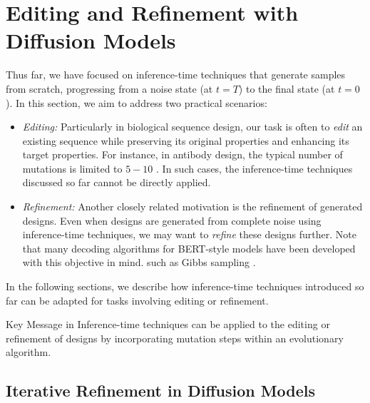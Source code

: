  \section{Editing and Refinement with Diffusion Models}\label{sec:editing}

Thus far, we have focused on inference-time techniques that generate samples from scratch, progressing from a noise state (at $t=T$) to the final state (at $t=0$). In this section, we aim to address two practical scenarios:
\begin{itemize}
\item \emph{Editing:} Particularly in biological sequence design, our task is often to \emph{edit} an existing sequence while preserving its original properties and enhancing its target properties. For instance, in antibody design, the typical number of mutations is limited to $5-10$ \citep{bachas2022antibody}. In such cases, the inference-time techniques discussed so far cannot be directly applied.
\item \emph{Refinement:} Another closely related motivation is the refinement of generated designs. Even when designs are generated from complete noise using inference-time techniques, we may want to \emph{refine} these designs further. Note that many decoding algorithms for BERT-style models have been developed with this objective in mind.
such as Gibbs sampling \citep{wang2019bert,miao2019cgmh}.
\end{itemize}
 In the following sections, we describe how inference-time techniques introduced so far can be adapted for tasks involving editing or refinement.

\begin{AIbox}{Key Message in }
Inference-time techniques can be applied to the editing or refinement of designs by incorporating mutation steps within an evolutionary algorithm.
\end{AIbox}

\subsection{Iterative Refinement in Diffusion Models} 

